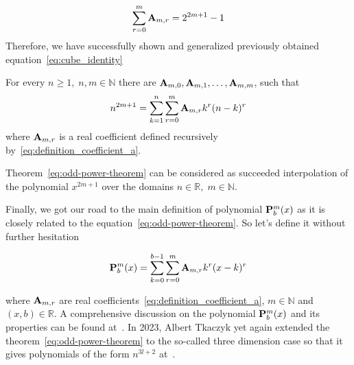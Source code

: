 \begin{equation*}
    \sum_{r=0}^{m} {\mathbf{A}} \sb{m,r} = 2^{2m+1} - 1
\end{equation*}
Therefore, we have successfully shown and generalized previously obtained equation~\eqref{eq:cube_identity}
\begin{thm}
    For every $n\geq 1, \; n,m\in\mathbb{N}$ there are ${\mathbf{A}} \sb{m,0}, {\mathbf{A}} \sb{m,1},\dots,{\mathbf{A}} \sb{m,m}$,
    such that
    \begin{equation*}
        n^{2m+1} = \sum_{k=1}^{n}\sum_{r=0}^{m} {\mathbf{A}} \sb{m,r} k^r (n-k)^r
        \label{eq:odd-power-theorem}
    \end{equation*}
    where ${\mathbf{A}} \sb{m,r}$ is a real coefficient defined recursively by~\eqref{eq:definition_coefficient_a}.
\end{thm}
Theorem~\eqref{eq:odd-power-theorem} can be considered as succeeded interpolation of the polynomial $x^{2m+1}$
over the domains $n\in\mathbb{R}, \; m\in\mathbb{N}$.

Finally, we got our road to the main definition of polynomial ${\mathbf{P}}\sp{m} \sb{b}(x)$
as it is closely related to the equation~\eqref{eq:odd-power-theorem}.
So let's define it without further hesitation
\begin{defn}
    \begin{equation}
        {\mathbf{P}}\sp{m} \sb{b}(x) = \sum_{k=0}^{b-1} \sum_{r=0}^{m} {\mathbf{A}} \sb{m,r} k^r(x-k)^r
        \label{eq:definition_polynomial_p}
    \end{equation}
\end{defn}
where ${\mathbf{A}} \sb{m,r}$ are real coefficients~\eqref{eq:definition_coefficient_a}, $m\in\mathbb{N}$ and $(x, b)\in \mathbb{R}$.
A comprehensive discussion on the polynomial ${\mathbf{P}}\sp{m} \sb{b}(x)$ and its properties can be found at~\cite{kolosov2016link}.
In 2023, Albert Tkaczyk yet again extended the theorem~\eqref{eq:odd-power-theorem} to the so-called three dimension case
so that it gives polynomials of the form $n^{3l+2}$ at~\cite{albert_tkaczyk_2023_8371454}.

